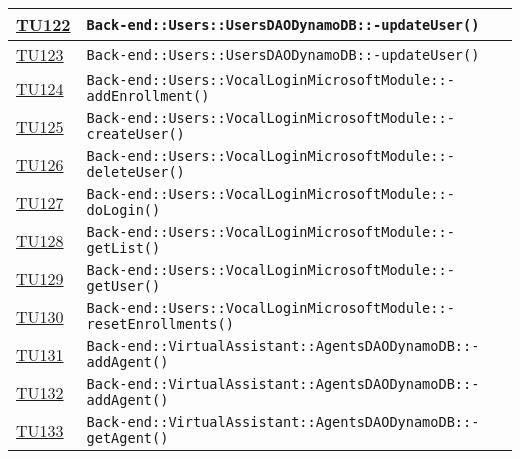 \begin{longtable}{|>{\centering}m{1cm}|m{12cm}<{\centering}|}
\hyperlink{TU122}{TU122} & \texttt{Back-end::Users::UsersDAODynamoDB::-\linebreak updateUser()}\\ \hline

\hyperlink{TU123}{TU123} & \texttt{Back-end::Users::UsersDAODynamoDB::-\linebreak updateUser()}\\ \hline

\hyperlink{TU124}{TU124} & \texttt{Back-end::Users::VocalLoginMicrosoftModule::-\linebreak addEnrollment()}\\ \hline

\hyperlink{TU125}{TU125} & \texttt{Back-end::Users::VocalLoginMicrosoftModule::-\linebreak createUser()}\\ \hline

\hyperlink{TU126}{TU126} & \texttt{Back-end::Users::VocalLoginMicrosoftModule::-\linebreak deleteUser()}\\ \hline

\hyperlink{TU127}{TU127} & \texttt{Back-end::Users::VocalLoginMicrosoftModule::-\linebreak doLogin()}\\ \hline

\hyperlink{TU128}{TU128} & \texttt{Back-end::Users::VocalLoginMicrosoftModule::-\linebreak getList()}\\ \hline

\hyperlink{TU129}{TU129} & \texttt{Back-end::Users::VocalLoginMicrosoftModule::-\linebreak getUser()}\\ \hline

\hyperlink{TU130}{TU130} & \texttt{Back-end::Users::VocalLoginMicrosoftModule::-\linebreak resetEnrollments()}\\ \hline

\hyperlink{TU131}{TU131} & \texttt{Back-end::VirtualAssistant::AgentsDAODynamoDB::-\linebreak addAgent()}\\ \hline

\hyperlink{TU132}{TU132} & \texttt{Back-end::VirtualAssistant::AgentsDAODynamoDB::-\linebreak addAgent()}\\ \hline

\hyperlink{TU133}{TU133} & \texttt{Back-end::VirtualAssistant::AgentsDAODynamoDB::-\linebreak getAgent()}\\ \hline


\end{longtable}
